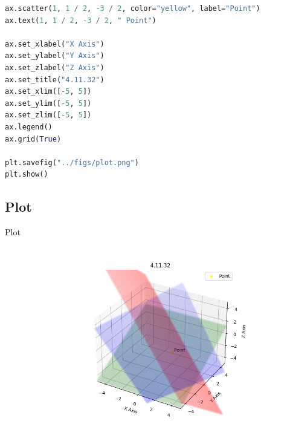\documentclass{beamer}
\theoremstyle{remark}
\numberwithin{equation}{section}
\begin{document}
\begin{frame}[fragile]
 \begin{lstlisting}[language=Python]
ax.scatter(1, 1 / 2, -3 / 2, color="yellow", label="Point")
ax.text(1, 1 / 2, -3 / 2, " Point")

ax.set_xlabel("X Axis")
ax.set_ylabel("Y Axis")
ax.set_zlabel("Z Axis")
ax.set_title("4.11.32")
ax.set_xlim([-5, 5])
ax.set_ylim([-5, 5])
ax.set_zlim([-5, 5])
ax.legend()
ax.grid(True)

plt.savefig("../figs/plot.png")
plt.show()
 \end{lstlisting}
\end{frame}
\subsection{Plot}
\begin{frame}{Plot}
 \begin{figure}[H]
    \centering
    \includegraphics[width=0.8\columnwidth]{../figs/plot.png}
    \caption*{}
    \label{fig:plot}
\end{figure}
\end{frame}
\end{document}
